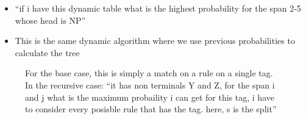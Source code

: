 \documentclass[11pt]{article}
\begin{document}
\begin{minipage}[l]{.5\linewidth}
    \begin{figure}[H]
        \centering
    \end{figure}    
\end{minipage}\hfill
\begin{minipage}[r]{.48\linewidth}
    \begin{itemize}
        \item ``if i have this dynamic table what is the highest probability for the span 2-5 whose head is NP''
        \item This is the same dynamic algorithm where we use previous probabilities to calculate the tree
    \end{itemize}
\end{minipage}

\begin{figure}[H]
    \centering
    \caption*{For the base case, this is simply a match on a rule on a single tag. In the recursive case: ``it has non terminals Y and Z, for the span i and j what is the maximum probaility i can get for this tag, i have to consider every posisble rule that has the tag. here, s is the split''}
\end{figure}
\end{document}
